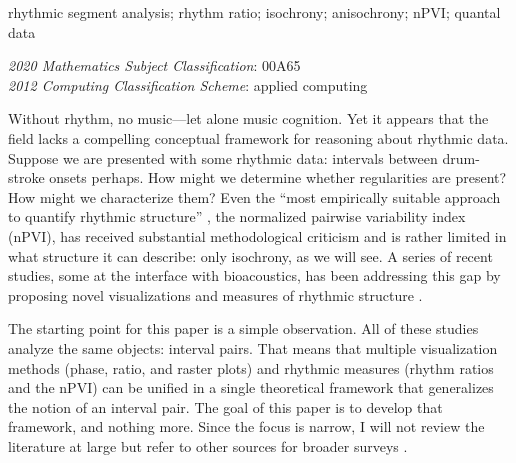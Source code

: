 \documentclass{tMAM2e}%
\theoremstyle{plain}
\theoremstyle{definition}
\theoremstyle{remark}
\begin{document}
\begin{keywords}
rhythmic segment analysis; rhythm ratio; isochrony; anisochrony; nPVI; quantal data
\end{keywords}

\begin{classcode}\textit{2020 Mathematics Subject Classification}: 00A65 \\
\textit{2012 Computing Classification Scheme}: applied computing
\end{classcode}



\noindent%
Without rhythm, no music—let alone music cognition. 
Yet it appears that the field lacks a compelling conceptual framework for reasoning about rhythmic data. 
Suppose we are presented with some rhythmic data: intervals between drum-stroke onsets perhaps. 
How might we determine whether regularities are present? How might we characterize them? 
%
Even the “most empirically suitable approach to quantify rhythmic structure” \citep{Ravignani2017MusicPercept}, the normalized pairwise variability index (nPVI), has received substantial methodological criticism \citep{Condit-Schultz2019MusicPercept} and is rather limited in what structure it can describe: only isochrony, as we will see. 
A series of recent studies, some at the interface with bioacoustics, has been addressing this gap by proposing novel visualizations and measures of rhythmic structure \citep{Burchardt2025OSF, Jadoul2025Vibration, Ravignani2017MusicPercept, Roeske2020CurrBiol}. 


The starting point for this paper is a simple observation. 
All of these studies analyze the same objects: interval pairs. 
That means that multiple visualization methods (phase, ratio, and raster plots) and rhythmic measures (rhythm ratios and the nPVI) can be unified in a single theoretical framework that generalizes the notion of an interval pair. 
The goal of this paper is to develop that framework, and nothing more. 
Since the focus is narrow, I will not review the literature at large but refer to other sources for broader surveys \citep{Burchardt2025OSF,Jadoul2025Vibration,VanHandel2022}. 
\end{document}
